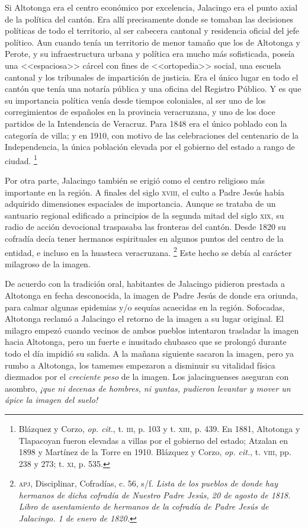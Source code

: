 \documentclass[14pt,twoside,final]{extbook} %
\let\oldfootnote\footnote
\renewcommand\footnote[1]{%
\oldfootnote{\hspace{1mm}#1}}
\begin{document}
Si Altotonga era el centro económico por excelencia, Jalacingo era el punto axial de la política del cantón. Era allí precisamente donde se tomaban las decisiones políticas de todo el territorio, al ser cabecera cantonal y residencia oficial del jefe político. Aun cuando tenía un territorio de menor tamaño que los de Altotonga y Perote, y su infraestructura urbana y política era mucho más sofisticada, poseía una <<espaciosa>> cárcel con fines de <<ortopedia>> social, una escuela cantonal y los tribunales de impartición de justicia. Era el único lugar en todo el cantón que tenía una notaría pública y una oficina del Registro Público. Y es que su importancia política venía desde tiempos coloniales, al ser uno de los corregimientos de españoles en la provincia veracruzana, y uno de los doce partidos de la Intendencia de Veracruz. Para 1848 era el único poblado con la categoría de villa; y en 1910, con motivo de las celebraciones del centenario de la Independencia, la única población elevada por el gobierno del estado a rango de ciudad.\footnote{Blázquez y Corzo, \emph{op. cit.}, t. \textsc{iii}, p. 103 y t. \textsc{xiii}, p. 439. En 1881, Altotonga y Tlapacoyan fueron elevadas a villas por el gobierno del estado; Atzalan en 1898 y Martínez de la Torre en 1910. Blázquez y Corzo, \emph{op. cit.}, t. \textsc{viii}, pp. 238 y 273; t. \textsc{xi}, p. 535.} \pagebreak[4]

Por otra parte, Jalacingo también se erigió como el centro religioso más importante en la región. A finales del siglo \textsc{xviii}, el culto a Padre Jesús había adquirido dimensiones espaciales de importancia. Aunque se trataba de un santuario regional edificado a principios de la segunda mitad del siglo \textsc{xix}, su radio de acción devocional traspasaba las fronteras del cantón. Desde 1820 su cofradía decía tener hermanos espirituales en algunos puntos del centro de la entidad, e incluso en la huasteca veracruzana.\footnote{\textsc{apj}, Disciplinar, Cofradías, c. 56, s/f. \emph{Lista de los pueblos de donde hay hermanos de dicha cofradía de Nuestro Padre Jesús, 20 de agosto de 1818. Libro de asentamiento de hermanos de la cofradía de Padre Jesús de Jalacingo. 1 de enero de 1820.}} Este hecho se debía al carácter milagroso de la imagen.

De acuerdo con la tradición oral, habitantes de Jalacingo pidieron prestada a Altotonga en fecha desconocida, la imagen de Padre Jesús de donde era oriunda, para calmar algunas epidemias y/o sequías acaecidas en la región. Sofocadas, Altotonga reclamó a Jalacingo el retorno de la imagen a su lugar original. El milagro empezó cuando vecinos de ambos pueblos intentaron trasladar la imagen hacia Altotonga, pero un fuerte e inusitado chubasco que se prolongó durante todo el día impidió su salida. A la mañana siguiente sacaron la imagen, pero ya rumbo a Altotonga, los tamemes empezaron a disminuir su vitalidad física diezmados por el \emph{creciente peso} de la imagen. Los jalacinguenses aseguran con asombro, \emph{¡que ni decenas de hombres, ni yuntas, pudieron levantar y mover un ápice la imagen del suelo!}
\end{document}

